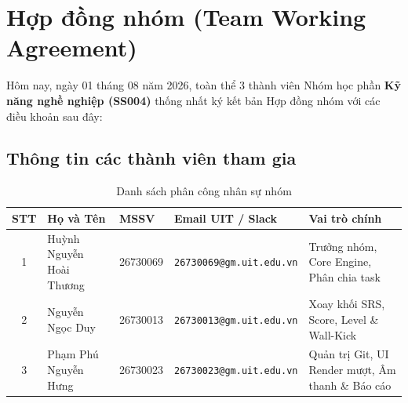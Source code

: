 \documentclass[12pt,a4paper]{article}
\begin{document}
\section{Hợp đồng nhóm (Team Working Agreement)}

\begin{tcolorbox}[colback=yellow!10!white,colframe=orange!80!black,title=\textbf{BẢN CAM KẾT VÀ NGUYÊN TẮC LÀM VIỆC NHÓM}]
    Hôm nay, ngày 01 tháng 08 năm 2026, toàn thể 3 thành viên Nhóm học phần \textbf{Kỹ năng nghề nghiệp (SS004)} thống nhất ký kết bản Hợp đồng nhóm với các điều khoản sau đây:
\end{tcolorbox}

\subsection{Thông tin các thành viên tham gia}
\begin{table}[h!]
\centering
\begin{tabularx}{\textwidth}{clllX}
\toprule
\textbf{STT} & \textbf{Họ và Tên} & \textbf{MSSV} & \textbf{Email UIT / Slack} & \textbf{Vai trò chính} \\
\midrule
1 & Huỳnh Nguyễn Hoài Thương & 26730069 & \texttt{26730069@gm.uit.edu.vn} & Trưởng nhóm, Core Engine, Phân chia task \\
2 & Nguyễn Ngọc Duy & 26730013 & \texttt{26730013@gm.uit.edu.vn} & Xoay khối SRS, Score, Level \& Wall-Kick \\
3 & Phạm Phú Nguyễn Hưng & 26730023 & \texttt{26730023@gm.uit.edu.vn} & Quản trị Git, UI Render mượt, Âm thanh \& Báo cáo \\
\bottomrule
\end{tabularx}
\caption{Danh sách phân công nhân sự nhóm}
\end{table}
\end{document}
